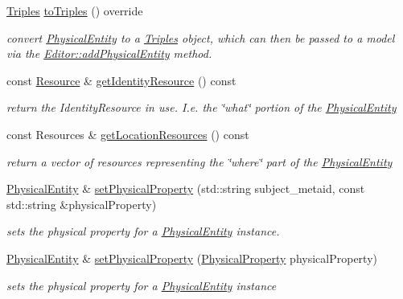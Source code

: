 \begin{DoxyCompactItemize}
\hyperlink{classomexmeta_1_1Triples}{Triples} \hyperlink{classomexmeta_1_1PhysicalEntity_a51f5df8b2e8a1d65e5aa0d10e53b77ba}{to\+Triples} () override
\begin{DoxyCompactList}\small\item\em convert \hyperlink{classomexmeta_1_1PhysicalEntity}{Physical\+Entity} to a \hyperlink{classomexmeta_1_1Triples}{Triples} object, which can then be passed to a model via the \hyperlink{classomexmeta_1_1Editor_a0740831baafe244374ad7a324d51a87e}{Editor\+::add\+Physical\+Entity} method. \end{DoxyCompactList}\item 
const \hyperlink{classomexmeta_1_1Resource}{Resource} \& \hyperlink{classomexmeta_1_1PhysicalEntity_ae4b3374e9ebb817eb63f9105b491e958}{get\+Identity\+Resource} () const
\begin{DoxyCompactList}\small\item\em return the Identity\+Resource in use. I.\+e. the \char`\"{}what\char`\"{} portion of the \hyperlink{classomexmeta_1_1PhysicalEntity}{Physical\+Entity} \end{DoxyCompactList}\item 
const Resources \& \hyperlink{classomexmeta_1_1PhysicalEntity_a3e2fba07a4622db0180650d24bf263d9}{get\+Location\+Resources} () const
\begin{DoxyCompactList}\small\item\em return a vector of resources representing the \char`\"{}where\char`\"{} part of the \hyperlink{classomexmeta_1_1PhysicalEntity}{Physical\+Entity} \end{DoxyCompactList}\item 
\hyperlink{classomexmeta_1_1PhysicalEntity}{Physical\+Entity} \& \hyperlink{classomexmeta_1_1PhysicalEntity_a5d7168c527d2dbdacd612de37aa9a605}{set\+Physical\+Property} (std\+::string subject\+\_\+metaid, const std\+::string \&physical\+Property)
\begin{DoxyCompactList}\small\item\em sets the physical property for a \hyperlink{classomexmeta_1_1PhysicalEntity}{Physical\+Entity} instance. \end{DoxyCompactList}\item 
\hyperlink{classomexmeta_1_1PhysicalEntity}{Physical\+Entity} \& \hyperlink{classomexmeta_1_1PhysicalEntity_a9bca0cb13601b6f9617df9f264968f1f}{set\+Physical\+Property} (\hyperlink{classomexmeta_1_1PhysicalProperty}{Physical\+Property} physical\+Property)
\begin{DoxyCompactList}\small\item\em sets the physical property for a \hyperlink{classomexmeta_1_1PhysicalEntity}{Physical\+Entity} instance \end{DoxyCompactList}\item 

\end{DoxyCompactItemize}
